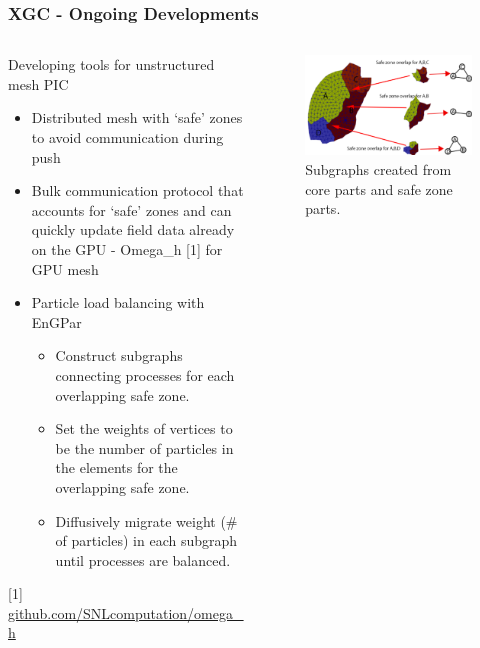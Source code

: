 \documentclass[aspectratio=169]{beamer}
\begin{document}
\begin{frame}
  \frametitle{XGC - Ongoing Developments}
  \begin{columns}
    \begin{column}{0.5\textwidth}
      Developing tools for unstructured mesh PIC
      \begin{itemize}
        \item Distributed mesh with `safe' zones to avoid communication during
          push
        \item Bulk communication protocol that accounts for `safe' zones and can
          quickly update field data already on the GPU - Omega\_h [1] for GPU mesh
        \item Particle load balancing with EnGPar
        \begin{itemize}
          \item Construct subgraphs connecting processes
            for each overlapping safe zone.
          \item Set the weights of vertices to be the
            number of particles in the elements for
            the overlapping safe zone.
          \item Diffusively migrate weight (\# of particles) in each
            subgraph until processes are balanced.
        \end{itemize}
      \end{itemize}
      {\tiny [1] \url{github.com/SNLcomputation/omega_h} }
    \end{column}
    \begin{column}{0.5\textwidth}
      \begin{figure}
        \centering
        \includegraphics[width=.6\textwidth]{figures/engparPIC.png}\\
        \small{Subgraphs created from core parts and safe zone parts.}
      \end{figure}
    \end{column}
  \end{columns}
\end{frame}
\end{document}
